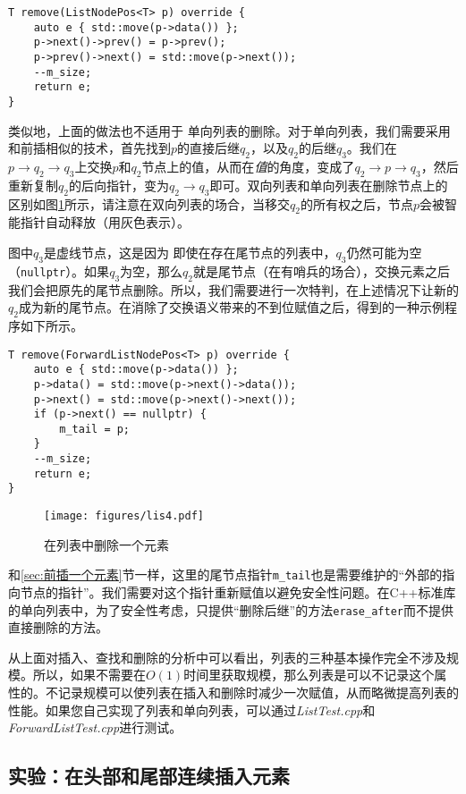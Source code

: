 \begin{lstlisting}
T remove(ListNodePos<T> p) override {
    auto e { std::move(p->data()) };
    p->next()->prev() = p->prev();
    p->prev()->next() = std::move(p->next());
    --m_size;
    return e;
}
\end{lstlisting}

类似地，上面的做法也不适用于
单向列表的删除。对于单向列表，我们需要采用和前插相似的技术，首先找到$p$的直接后继$q_2$，以及$q_2$的后继$q_3$。我们在$p\rightarrow q_2\rightarrow q_3$上交换$p$和$q_2$节点上的值，从而在\textit{值}的角度，变成了$q_2\rightarrow p \rightarrow q_3$，然后重新复制$q_2$的后向指针，变为$q_2\rightarrow q_3$即可。双向列表和单向列表在删除节点上的区别如图\ref{fig:lis4}所示，请注意在双向列表的场合，当移交$q_2$的所有权之后，节点$p$会被智能指针自动释放（用灰色表示）。

图中$q_3$是虚线节点，这是因为
即使在存在尾节点的列表中，$q_3$仍然可能为空（\lstinline{nullptr}）。如果$q_3$为空，那么$q_2$就是尾节点（在有哨兵的场合），交换元素之后我们会把原先的尾节点删除。所以，我们需要进行一次特判，在上述情况下让新的$q_2$成为新的尾节点。在消除了交换语义带来的不到位赋值之后，得到的一种示例程序如下所示。

\begin{lstlisting}
T remove(ForwardListNodePos<T> p) override {
    auto e { std::move(p->data()) };
    p->data() = std::move(p->next()->data());
    p->next() = std::move(p->next()->next());
    if (p->next() == nullptr) {
        m_tail = p;
    }
    --m_size;
    return e;
}
\end{lstlisting}

\begin{figure}
  \centering
  \texttt{[image: figures/lis4.pdf]}
  \caption{在列表中删除一个元素}
  \label{fig:lis4}
\end{figure}

和\ref{sec:前插一个元素}节一样，这里的尾节点指针\lstinline{m_tail}也是需要维护的“外部的指向节点的指针”。我们需要对这个指针重新赋值以避免安全性问题。在C++标准库的单向列表中，为了安全性考虑，只提供“删除后继”的方法\lstinline{erase_after}而不提供直接删除的方法。

从上面对插入、查找和删除的分析中可以看出，列表的三种基本操作完全不涉及规模。所以，如果不需要在$O(1)$时间里获取规模，那么列表是可以不记录这个属性的。不记录规模可以使列表在插入和删除时减少一次赋值，从而略微提高列表的性能。如果您自己实现了列表和单向列表，可以通过\textit{ListTest.cpp}和\textit{ForwardListTest.cpp}进行测试。

\subsection{实验：在头部和尾部连续插入元素}

